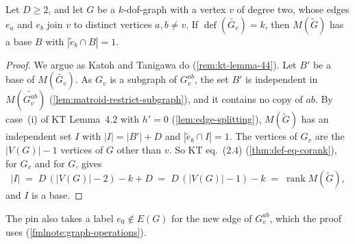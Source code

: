 \begin{lemma}
  \label{lem:removal-deficiency-equality}
  \leanok
  Let $D \ge 2$, and let $G$ be a $k$-dof-graph with a vertex $v$ of
  degree two, whose edges $e_a$ and $e_b$ join $v$ to distinct vertices
  $a, b \neq v$. If $\operatorname{def}(\widetilde{G_v}) = k$, then
  $M(\tilde G)$ has a base $B$ with $|\tilde e_b \cap B| = 1$.
\end{lemma}
\begin{proof}
  \leanok
  We argue as Katoh and Tanigawa do (\cref{rem:kt-lemma-44}). Let $B'$ be
  a base of $M(\widetilde{G_v})$. As $G_v$ is a subgraph of $G_v^{ab}$,
  the set $B'$ is independent in $M(\widetilde{G_v^{ab}})$
  (\cref{lem:matroid-restrict-subgraph}), and it contains no copy of
  $ab$. By case~(i) of KT Lemma~4.2 with $h' = 0$
  (\cref{lem:edge-splitting}), $M(\tilde G)$ has an independent set $I$
  with $|I| = |B'| + D$ and $|\tilde e_b \cap I| = 1$. The vertices of
  $G_v$ are the $|V(G)| - 1$ vertices of $G$ other than $v$. So KT
  eq.~(2.4) (\cref{thm:def-eq-corank}), for $G_v$ and for $G$, gives
  \[
    |I| \;=\; D\,(|V(G)| - 2) - k + D \;=\; D\,(|V(G)| - 1) - k
    \;=\; \operatorname{rank} M(\tilde G),
  \]
  and $I$ is a base.
\end{proof}
\begin{fmlnote}
  The pin also takes a label $e_0 \notin E(G)$ for the new edge of
  $G_v^{ab}$, which the proof uses (\cref{fmlnote:graph-operations}).
\end{fmlnote}

